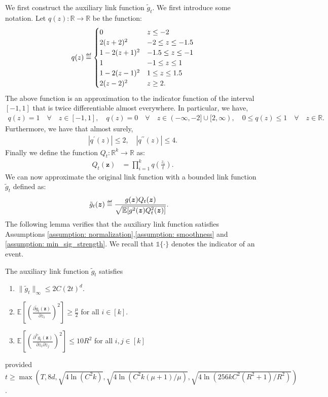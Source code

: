 \documentclass[final,12pt]{colt2018} %
\newcommand{\E}{\mathbb{E}}
\newcommand{\R}{\mathbb{R}}
\newcommand{\explain}[2]{\mathrel{\overset{\makebox[0pt]{\mbox{\normalfont\tiny\sffamily #1}}}{#2}}}
\renewcommand\v[1]{{\ensuremath{\boldsymbol{#1}}}}
\newcommand{\indicator}[1]{\mathds{1}\{#1\}}
\begin{document}
We first construct the auxiliary link function $\tilde{g}_t$. We first introduce some notation. 
Let $q(z): \R \rightarrow \R$ be the function:
\[ q(z) \explain{def}{=}  \begin{cases} 
      0 & z\leq -2 \\
      2(z+2)^2  & -2\leq z\leq -1.5 \\
      1-2(z+1)^2 & -1.5 \leq z \leq -1 \\
      1 & -1 \leq z \leq 1 \\
      1-2(z-1)^2 & 1 \leq z \leq 1.5 \\
      2(z-2)^2 &  z \geq 2.
   \end{cases}
\]
The above function is an approximation to the indicator function of the interval $[-1,1]$ that is twice differentiable almost everywhere. In particular, we have,
\begin{align*}
    q(z) = 1 \quad \forall \quad z \in [-1,1], \quad q(z) = 0 \quad \forall \quad z \in (-\infty, -2] \cup [2,\infty), \quad 0 \leq q(z) \leq 1 \quad \forall \quad z\in \R. %
\end{align*}
Furthermore,
we have that almost surely, 
\begin{align*}
    |q^\prime(z)| \leq 2, \quad |q^{\prime\prime}(z)| \leq 4.
\end{align*}
Finally we define the function $Q_t: \R^k \rightarrow \R$ as:
\begin{align*}
    Q_t(\v z) & = \prod_{i=1}^k q\left(\frac{z_i}{t}\right).
\end{align*}
We can now approximate the original link function with a bounded link function $\tilde{g}_t$ defined as:
\begin{align*}
    \tilde{g}_t(\v z) & \explain{def}{=} \frac{g(\v z) Q_t(\v z)}{\sqrt{\E[g^2(\v z) Q^2_t(\v z)]}}.
\end{align*}
The following lemma verifies that the auxiliary link function satisfies Assumptions \ref{assumption: normalization},\ref{assumption: smoothness} and \ref{assumption: min_sig_strength}. We recall that $\indicator{\cdot}$ denotes the indicator of an event. 
\begin{lemma} The auxiliary link function $\tilde{g}_t$ satisfies 
\begin{enumerate}
    \item $\| \tilde{g}_t \|_\infty \leq  2C(2t)^d$. 
    \item $\E[( \frac{\partial \tilde{g}_t(\v z)}{\partial z_i})^2] \geq \frac{\mu}{2}$ for all $i \in [k]$.
    \item $\E [ (\frac{\partial^2 \tilde{g}_t(\v z)}{\partial z_i \partial z_j})^2 ] \leq 10R^2$ for all $i,j \in [k]$
\end{enumerate}
provided $t \geq \max(T,8d,\sqrt{4\ln(C^2 k)},\sqrt{4\ln(C^2 k(\mu+1)/\mu)},\sqrt{4 \ln(256kC^2(R^2+1)/R^2)})$.
\label{aux_link_func_prop}
\end{lemma}
\end{document}
